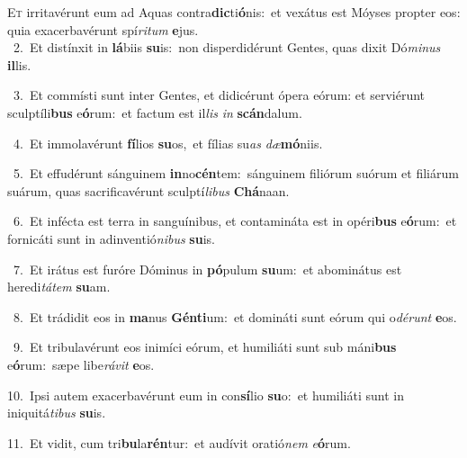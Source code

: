 \lettrine{\initial\textcolor{\initialcolor}{E}}{t} irritavérunt eum ad Aquas contra\-\textbf{dic}\-ti\-\textbf{ó}\-nis:~\star et vexátus est Móyses propter eos: quia exacerbavérunt spí\-\textit{ri}\-\textit{tum} \textbf{e}\-jus.\\
{\numbfont\textcolor{\numbcolor}{~2.}}~Et distínxit in \textbf{lá}\-biis \textbf{su}\-is:~\star non disperdidérunt Gentes, quas dixit Dó\-\textit{mi}\-\textit{nus} \textbf{il}\-lis.\par
{\numbfont\textcolor{\numbcolor}{~3.}}~Et commísti sunt inter Gentes, et didicérunt ópera eórum: et serviérunt sculptíli\textbf{bus} e\-\textbf{ó}\-rum:~\star et factum est il\textit{lis} \textit{in} \textbf{scán}\-dalum.\par
{\numbfont\textcolor{\numbcolor}{~4.}}~Et immolavérunt \textbf{fí}\-lios \textbf{su}\-os,~\star et fílias su\textit{as} \textit{dæ}\-\textbf{mó}niis.\par
{\numbfont\textcolor{\numbcolor}{~5.}}~Et effudérunt sánguinem \textbf{in}\-no\-\textbf{cén}\-tem:~\star sánguinem filiórum suórum et filiárum suárum, quas sacrificavérunt sculptí\-\textit{li}\-\textit{bus} \textbf{Chá}\-naan.\par
{\numbfont\textcolor{\numbcolor}{~6.}}~Et infécta est terra in sanguínibus, et contamináta est in opéri\textbf{bus} e\-\textbf{ó}\-rum:~\star et fornicáti sunt in adinventió\-\textit{ni}\-\textit{bus} \textbf{su}\-is.\par
{\numbfont\textcolor{\numbcolor}{~7.}}~Et irátus est furóre Dóminus in \textbf{pó}\-pulum \textbf{su}\-um:~\star et abominátus est heredi\-\textit{tá}\-\textit{tem} \textbf{su}\-am.\par
{\numbfont\textcolor{\numbcolor}{~8.}}~Et trádidit eos in \textbf{ma}\-nus \textbf{Gén}\-\textbf{ti}um:~\star et domináti sunt eórum qui o\-\textit{dé}\-\textit{runt} \textbf{e}\-os.\par
{\numbfont\textcolor{\numbcolor}{~9.}}~Et tribulavérunt eos inimíci eórum, et humiliáti sunt sub máni\textbf{bus} e\-\textbf{ó}\-rum:~\star sæpe libe\-\textit{rá}\-\textit{vit} \textbf{e}\-os.\par
{\numbfont\textcolor{\numbcolor}{10.}}~Ipsi autem exacerbavérunt eum in con\-\textbf{sí}\-lio \textbf{su}\-o:~\star et humiliáti sunt in iniquitá\-\textit{ti}\-\textit{bus} \textbf{su}\-is.\par
{\numbfont\textcolor{\numbcolor}{11.}}~Et vidit, cum tri\-\textbf{bu}\-la\-\textbf{rén}\-tur:~\star et audívit oratió\textit{nem} \textit{e}\-\textbf{ó}rum.\par
